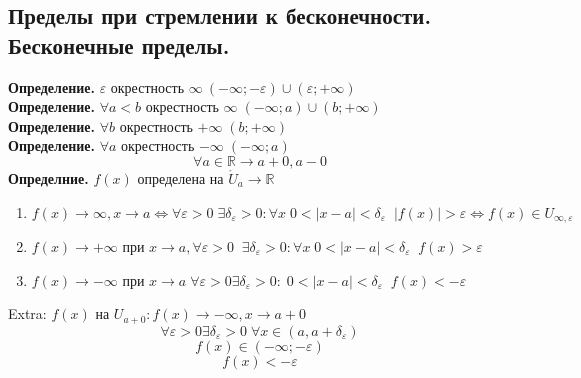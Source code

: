 \documentclass[12pt, a4paper]{article}
\newcommand{\R}{\mathbb{R}}
\newcommand{\eps}{\varepsilon}
\begin{document}
\subsection{Пределы при стремлении к бесконечности. Бесконечные пределы.}
\textbf{Определение.} $\eps$ окрестность $\infty\ (-\infty; - \eps) \cup (\eps; +\infty)$\\
\textbf{Определение.} $\forall a < b$ окрестность $\infty\; (-\infty; a) \cup (b; +\infty)$\\
\textbf{Определение.} $\forall b$ окрестность $+\infty\; (b; +\infty)$\\
\textbf{Определение.} $\forall a$ окрестность $-\infty\; (-\infty; a)$\\
\[ \forall a \in \R \rightarrow a + 0, a-0 \]
\textbf{Определние.} $f(x)$ определена на $\mathring U_a \rightarrow \R$ \\
\begin{enumerate}
	\item $ f(x) \to \infty, x \to a \Leftrightarrow \forall \eps > 0\; \exists \delta_\eps > 0: \forall x\; 0< |x - a| < \delta_\eps \;\; |f(x)| > \eps \Leftrightarrow f(x) \in U_{\infty, \eps}$
	\item $f(x) \to +\infty$ при $x \to a, \forall \eps > 0 \;\; \exists \delta_\eps > 0: \forall x\; 0 < |x - a| < \delta_\eps \;\; f(x) > \eps$
	\item $f(x) \to -\infty$ при $x \to a \; \forall \eps > 0 \exists \delta_\eps > 0: \; 0 < |x - a| < \delta_\eps \;\; f(x) < -\eps $
\end{enumerate}
Extra: $f(x)$ на $U_{a + 0}: f(x) \to - \infty, x \to a + 0$
\[ \forall \eps > 0 \exists \delta_\eps > 0 \; \forall x \in (a, a + \delta_\eps) \]
\[ f(x) \in (-\infty; -\eps ) \]
\[ f(x) < -\eps \]
\end{document}
